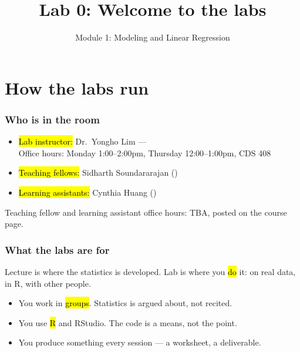 \documentclass[slidestop,compress,mathserif]{beamer}
\title[Lab 0]{Lab 0: Welcome to the labs}
\subtitle{Module 1: Modeling and Linear Regression}
\date{}
\begin{document}

\maketitleframe



\section{How the labs run}
\begin{frame}
\frametitle{Who is in the room}

\begin{itemize}
  \item \hl{Lab instructor:} Dr.~Yongho Lim ---  \\
        Office hours: Monday 1:00--2:00pm, Thursday 12:00--1:00pm, CDS 408
  \item \hl{Teaching fellows:} Sidharth Soundararajan ()
  \item \hl{Learning assistants:} Cynthia Huang ()

\end{itemize}

\vspace{0.5em}
Teaching fellow and learning assistant office hours: TBA, posted on the
course page.


\end{frame}
\begin{frame}
\frametitle{What the labs are for}

Lecture is where the statistics is developed. Lab is where you
\hl{do} it: on real data, in R, with other people.

\vspace{0.5em}
\begin{itemize}
  \item You work in \hl{groups}. Statistics is argued about, not
        recited.
  \item You use \hl{R} and RStudio. The code is a means, not the point.
  \item You produce something every session --- a worksheet, a
        deliverable.
\end{itemize}


\end{frame}
\end{document}
